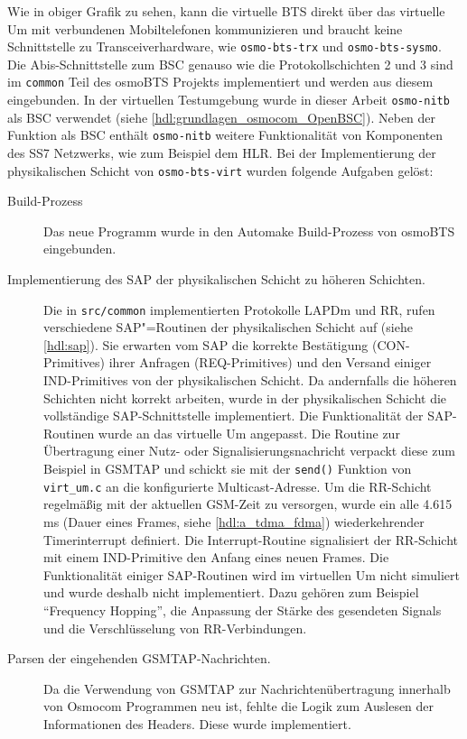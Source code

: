 Wie in obiger Grafik zu sehen, kann die virtuelle \ac{BTS} direkt über das virtuelle \ac{Um} mit verbundenen Mobiltelefonen kommunizieren und braucht keine Schnittstelle zu Transceiverhardware, wie \texttt{osmo-bts-trx} und \texttt{osmo-bts-sysmo}. Die Abis-Schnittstelle zum \ac{BSC} genauso wie die Protokollschichten 2 und 3 sind im \texttt{common} Teil des osmoBTS Projekts implementiert und werden aus diesem eingebunden. In der virtuellen Testumgebung wurde in dieser Arbeit \texttt{osmo-nitb} als \ac{BSC} verwendet (siehe \autoref{hdl:grundlagen_osmocom_OpenBSC}). Neben der Funktion als \ac{BSC} enthält \texttt{osmo-nitb} weitere Funktionalität von Komponenten des \ac{SS7} Netzwerks, wie zum Beispiel dem \ac{HLR}. Bei der Implementierung der physikalischen Schicht von \texttt{osmo-bts-virt} wurden folgende Aufgaben gelöst:
\begin{description}
\item[Build-Prozess] Das neue Programm wurde in den Automake Build-Prozess von osmoBTS eingebunden.
\item[Implementierung des \ac{SAP} der physikalischen Schicht zu höheren Schichten.] Die in \texttt{src/common} implementierten Protokolle \ac{LAPDm} und \ac{RR}, rufen verschiedene \ac{SAP}"=Rou\-tinen der physikalischen Schicht auf (siehe \autoref{hdl:sap}). Sie erwarten vom \ac{SAP} die korrekte Bestätigung (\ac{CON}-Primitives) ihrer Anfragen (\ac{REQ}-Primitives) und den Versand einiger \ac{IND}-Primitives von der physikalischen Schicht. Da andernfalls die höheren Schichten nicht korrekt arbeiten, wurde in der physikalischen Schicht die vollständige \ac{SAP}-Schnittstelle implementiert. Die Funktionalität der \ac{SAP}-Routinen wurde an das virtuelle \ac{Um} angepasst. Die Routine zur Übertragung einer Nutz- oder Signalisierungsnachricht verpackt diese zum Beispiel in \ac{GSMTAP} und schickt sie mit der \texttt{send()} Funktion von \texttt{virt\_um.c} an die konfigurierte Multicast-Adresse. Um die \ac{RR}-Schicht regelmäßig mit der aktuellen \ac{GSM}-Zeit zu versorgen, wurde ein alle 4.615 ms (Dauer eines Frames, siehe \autoref{hdl:a_tdma_fdma}) wiederkehrender Timerinterrupt definiert. Die Interrupt-Routine signalisiert der \ac{RR}-Schicht mit einem \ac{IND}-Primitive den Anfang eines neuen Frames. Die Funktionalität einiger \ac{SAP}-Routinen wird im virtuellen \ac{Um} nicht simuliert und wurde deshalb nicht implementiert. Dazu gehören zum Beispiel "`Frequency Hopping"', die Anpassung der Stärke des gesendeten Signals und die Verschlüsselung von \ac{RR}-Verbindungen.
\item[Parsen der eingehenden \ac{GSMTAP}-Nachrichten.] Da die Verwendung von \ac{GSMTAP} zur Nachrichtenübertragung innerhalb von Osmocom Programmen neu ist, fehlte die Logik zum Auslesen der Informationen des Headers. Diese wurde implementiert.

\end{description}
